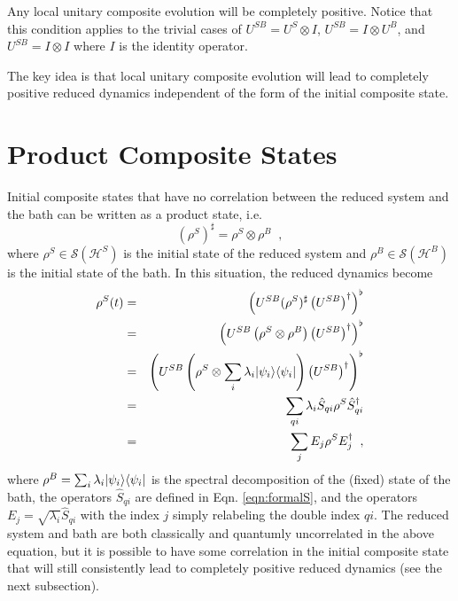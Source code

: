 Any local unitary composite evolution will be completely positive.  Notice that this condition applies to the trivial cases of $U^{SB} = U^S \otimes I$, $U^{SB} = I\otimes U^B$, and $U^{SB} = I\otimes I$ where $I$ is the identity operator. 

The key idea is that local unitary composite evolution will lead to completely positive reduced dynamics independent of the form of the initial composite state. 

\section{Product Composite States}
\label{sec:prodstates}
Initial composite states that have no correlation between the reduced system and the bath can be written as a product state, i.e.\
\begin{equation*}
(\rho^S)^\sharp = \rho^S \otimes \rho^B\;\;,
\end{equation*}
where $\rho^S\in\mathcal{S}(\mathcal{H}^S)$ is the initial state of the reduced system and $\rho^B\in\mathcal{S}(\mathcal{H}^B)$ is the initial state of the bath.  In this situation, the reduced dynamics become
\begin{eqnarray*}
\rho^S(t) &=& \left(U^{SB}(\rho^{S})^\sharp\left(U^{SB}\right)^\dagger\right)^\flat\\
&=&\left(U^{SB}\left(\rho^S\otimes\rho^B\right)\left(U^{SB}\right)^\dagger\right)^\flat\\
&=& \left(U^{SB}\left(\rho^S\otimes\sum_i \lambda_i |\psi_i\rangle\langle\psi_i|\right)\left(U^{SB}\right)^\dagger\right)^\flat\\
&=& \sum_{qi} \lambda_i \hat{S}_{qi} \rho^S \hat{S}^\dagger_{qi}\\
&=& \sum_j E_j \rho^S E_j^\dagger\;\;,
\end{eqnarray*}
where $\rho^B=\sum_i \lambda_i |\psi_i\rangle\langle\psi_i|$ is the spectral decomposition of the (fixed) state of the bath, the operators $\hat{S}_{qi}$ are defined in Eqn. \ref{eqn:formalS}, and the operators $E_j=\sqrt{\lambda_i}\hat{S}_{qi}$ with the index $j$ simply relabeling the double index $qi$.  The reduced system and bath are both classically and quantumly uncorrelated in the above equation, but it is possible to have some correlation in the initial composite state that will still consistently lead to completely positive reduced dynamics (see the next subsection).

